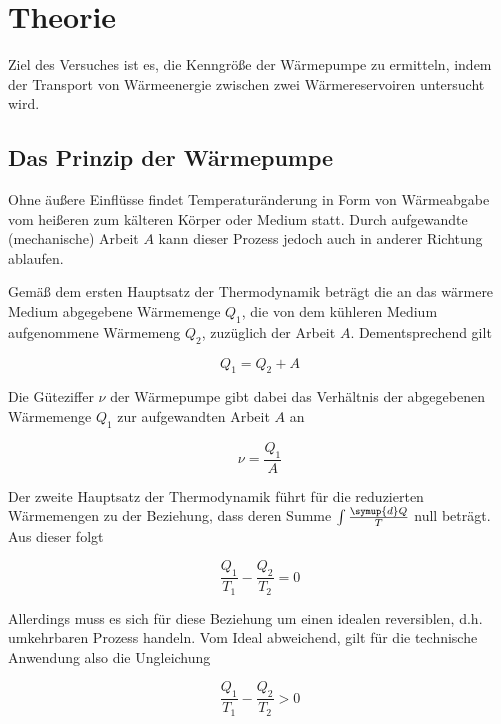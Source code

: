 \section{Theorie}
\label{sec:Theorie}

Ziel des Versuches ist es, die Kenngröße der Wärmepumpe zu 
ermitteln, indem der Transport von Wärmeenergie zwischen
zwei Wärmereservoiren untersucht wird.

\subsection{Das Prinzip der Wärmepumpe}

Ohne äußere Einflüsse findet Temperaturänderung in Form von Wärmeabgabe
vom heißeren zum kälteren Körper oder Medium statt. Durch aufgewandte 
(mechanische) Arbeit $A$ kann dieser Prozess jedoch auch in anderer
Richtung ablaufen. 

Gemäß dem ersten Hauptsatz der Thermodynamik beträgt 
die an das wärmere Medium abgegebene Wärmemenge $Q_1$, die von dem kühleren 
Medium aufgenommene Wärmemeng $Q_2$, zuzüglich der Arbeit $A$. Dementsprechend gilt

\begin{equation}
    Q_1 = Q_2 + A
    \label{eqn:Wärm}
\end{equation}

Die Güteziffer $\nu$ der Wärmepumpe gibt dabei das Verhältnis der abgegebenen 
Wärmemenge $Q_1$ zur aufgewandten Arbeit $A$ an

\begin{equation}
    \nu = \frac{Q_1}{A}
    \label{eqn:Güte}
\end{equation}

Der zweite Hauptsatz der Thermodynamik führt für die reduzierten Wärmemengen 
zu der Beziehung, dass deren Summe $\int \frac{\symup{d}Q}{T}$ null beträgt. 
Aus dieser folgt

\begin{equation}
    \frac{Q_1}{T_1} - \frac{Q_2}{T_2} = 0
    \label{eqn:redWärm}
\end{equation}

Allerdings muss es sich für diese Beziehung um einen idealen reversiblen, d.h. 
umkehrbaren Prozess handeln. Vom Ideal abweichend, gilt für die technische 
Anwendung also die Ungleichung

\begin{equation}
    \frac{Q_1}{T_1} - \frac{Q_2}{T_2} > 0
    \label{eqn:ungWärme}
\end{equation}

